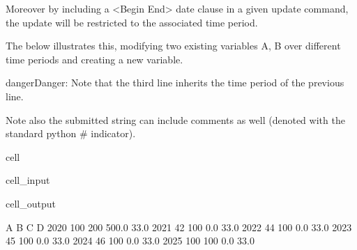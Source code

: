 \documentclass[letterpaper,10pt,english]{jupyterBook}
\begin{document}
\sphinxAtStartPar
Moreover by including a <Begin End> date clause in a given update command, the update will be restricted to the associated time period.

\sphinxAtStartPar
The below illustrates this, modifying two existing variables A, B over different time periods and creating a new variable.

\begin{sphinxadmonition}{danger}{Danger:}
\sphinxAtStartPar
Note that the third line inherits the time period of the previous line.

\sphinxAtStartPar
Note also the submitted string can include comments as well (denoted with the standard python \# indicator).
\end{sphinxadmonition}

\begin{sphinxuseclass}{cell}\begin{sphinxVerbatimInput}

\begin{sphinxuseclass}{cell_input}
\begin{sphinxVerbatim}[commandchars=\\\{\}]
\end{sphinxVerbatim}

\end{sphinxuseclass}\end{sphinxVerbatimInput}
\begin{sphinxVerbatimOutput}

\begin{sphinxuseclass}{cell_output}
\begin{sphinxVerbatim}[commandchars=\\\{\}]
        A    B      C     D
2020  100  200  500.0  33.0
2021   42  100    0.0  33.0
2022   44  100    0.0  33.0
2023   45  100    0.0  33.0
2024   46  100    0.0  33.0
2025  100  100    0.0  33.0
\end{sphinxVerbatim}

\end{sphinxuseclass}\end{sphinxVerbatimOutput}

\end{sphinxuseclass}
\end{document}
